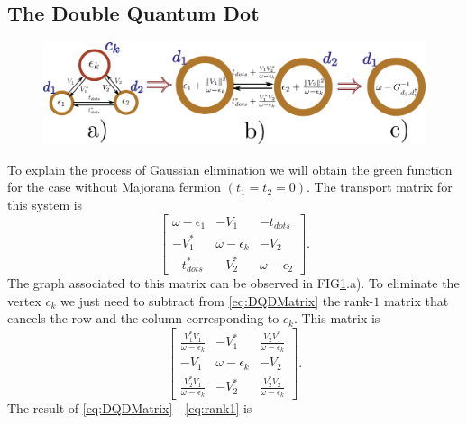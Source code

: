 \documentclass[showpacs,aps,prb,reprint,superscriptaddress]{revtex4-1}
\begin{document}
\subsection{The Double Quantum Dot}


        \begin{figure}[t]
        \begin{center}
        \includegraphics[scale=0.27]{Graficos/Graph_DQD-Pro.png}
        \caption{ 
        }
        \label{fig:GraphsDQD}
        \end{center}
        \end{figure}




To explain the process of Gaussian elimination we will obtain the green function for the case without Majorana fermion $(t_1= t_2=0)$.  The transport matrix for this system is 
\begin{equation}
        \left[\begin{array}{ccc}
    \omega-\epsilon_{1} & -V_{1} & -t_{dots}\\
    -V_{1}^{*} & \omega-\epsilon_{k} & -V_{2}\\
    -t_{dots}^{*} & -V_{2}^{*} & \omega-\epsilon_{2}
    \end{array}\right]. \label{eq:DQDMatrix}
\end{equation}
\noindent The graph associated to this matrix can be observed in FIG\ref{fig:GraphsDQD}.a). To eliminate the vertex $c_k$ we just need to subtract from \eqref{eq:DQDMatrix} the rank-$1$ matrix that cancels the row and the column corresponding to $c_k$. This matrix is 
\begin{equation}
        \left[\begin{array}{ccc}
    \frac{V_{1}^{*}V_{1}}{\omega-\epsilon_{k}} & -V_{1}^{*} & \frac{V_{2}V_{1}^{*}}{\omega-\epsilon_{k}}\\
    -V_{1} & \omega-\epsilon_{k} & -V_{2}\\
    \frac{V_{2}^{*}V_{1}}{\omega-\epsilon_{k}} & -V_{2}^{*} & \frac{V_{2}^{*}V_{2}}{\omega-\epsilon_{k}}
    \end{array}\right]. \label{eq:rank1}
\end{equation}
The result of \eqref{eq:DQDMatrix} -  \eqref{eq:rank1} is 
\end{document}
